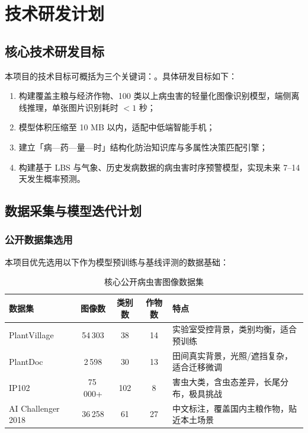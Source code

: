 \chapter{技术研发计划}

\section{核心技术研发目标}

本项目的技术目标可概括为三个关键词：。具体研发目标如下：

\begin{enumerate}[leftmargin=1.6em]
  \item 构建覆盖主粮与经济作物、100 类以上病虫害的轻量化图像识别模型，端侧离线推理，单张图片识别耗时 $<1$ 秒；
  \item 模型体积压缩至 10 MB 以内，适配中低端智能手机；
  \item 建立「病—药—量—时」结构化防治知识库与多属性决策匹配引擎；
  \item 构建基于 LBS 与气象、历史发病数据的病虫害时序预警模型，实现未来 7--14 天发生概率预测。
\end{enumerate}

\section{数据采集与模型迭代计划}

\subsection{公开数据集选用}

本项目优先选用以下作为模型预训练与基线评测的数据基础：

\begin{table}[H]
  \centering
  \small
  \renewcommand{\arraystretch}{1.3}
  \caption{核心公开病虫害图像数据集}
  \begin{tabular}{p{3.6cm}ccc p{5.2cm}}
    \toprule
    数据集 & 图像数 & 类别数 & 作物数 & 特点 \\
    \midrule
    PlantVillage & 54\,303 & 38 & 14 & 实验室受控背景，类别均衡，适合预训练 \\
    PlantDoc & 2\,598 & 30 & 13 & 田间真实背景，光照/遮挡复杂，适合迁移微调 \\
    IP102 & 75\,000+ & 102 & 8 & 害虫大类，含虫态差异，长尾分布，极具挑战 \\
    AI Challenger 2018 & 36\,258 & 61 & 27 & 中文标注，覆盖国内主粮作物，贴近本土场景 \\
    \bottomrule
  \end{tabular}
\end{table}

